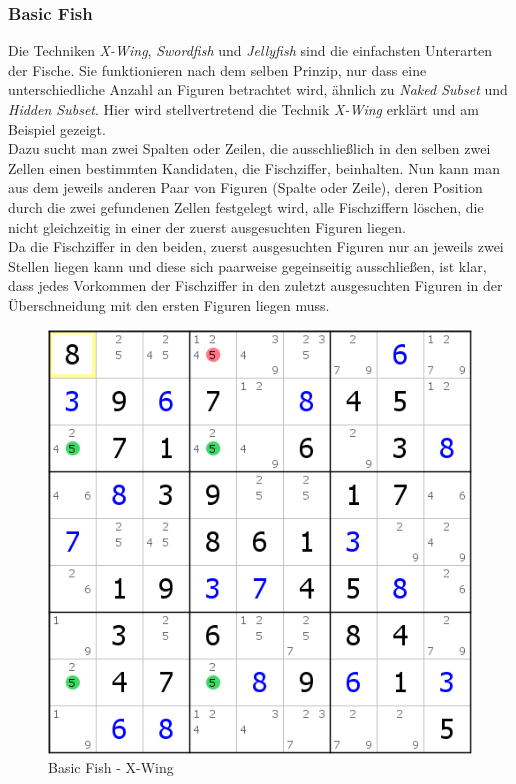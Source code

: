 \newpage
\subsubsection{Basic Fish}
\label{X-Wing}
Die Techniken \textit{X-Wing}, \textit{Swordfish} und \textit{Jellyfish} sind die einfachsten Unterarten der Fische. Sie funktionieren nach dem selben Prinzip, nur dass eine unterschiedliche Anzahl an Figuren betrachtet wird, ähnlich zu \textit{Naked Subset} und \textit{Hidden Subset}. Hier wird stellvertretend die Technik \textit{X-Wing} erklärt und am Beispiel gezeigt.\\
Dazu sucht man zwei Spalten oder Zeilen, die ausschließlich in den selben zwei Zellen einen bestimmten Kandidaten, die Fischziffer, beinhalten. Nun kann man aus dem jeweils anderen Paar von Figuren (Spalte oder Zeile), deren Position durch die zwei gefundenen Zellen festgelegt wird, alle Fischziffern löschen, die nicht gleichzeitig in einer der zuerst ausgesuchten Figuren liegen.\\
Da die Fischziffer in den beiden, zuerst ausgesuchten Figuren nur an jeweils zwei Stellen liegen kann und diese sich paarweise gegeinseitig ausschließen, ist klar, dass jedes Vorkommen der Fischziffer in den zuletzt ausgesuchten Figuren in der Überschneidung mit den ersten Figuren liegen muss.

\begin{figure}[h]
\begin{center}
\includegraphics{./img/x_wing.png}
\caption{Basic Fish - X-Wing}
\end{center}
\end{figure}

